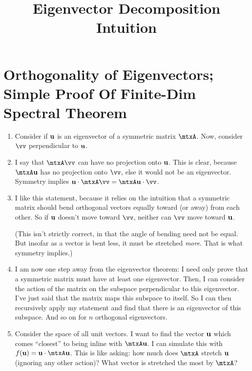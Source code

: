 \documentclass[11pt, oneside]{amsart}
\begin{document}
\title{Eigenvector Decomposition Intuition}
\maketitle


\section{Orthogonality of Eigenvectors; Simple Proof Of Finite-Dim Spectral Theorem}

\begin{enumerate}
  \item Consider if $\bm{\mathrm{u}}$ is an eigenvector of a symmetric matrix
  $\mtxA$. Now, consider $\vv$ perpendicular to $\bm{\mathrm{u}}$.

  \item I say that $\mtxA \vv$ can have no projection onto $\bm{\mathrm{u}}$. This
  is clear, because $\mtxA \vu$ has no projection onto $\vv$, else it
  would not be an eigenvector. Symmetry implies $\vu \cdot \mtxA\vv =
  \mtxA\vu \cdot \vv$.

  \item I like this statement, because it relies on the intuition that a
  symmetric matrix should bend orthogonal vectors equally toward (or
  away) from each other. So if $\bm{\mathrm{u}}$ doesn't move toward $\vv$, neither
  can $\vv$ move toward $\bm{\mathrm{u}}$.

  (This isn't strictly correct, in that the angle of bending need not be
  equal. But insofar as a vector is bent less, it must be stretched
  \emph{more}. That is what symmetry implies.)

  \item I am now one step away from the eigenvector theorem: I need only
  prove that a symmetric matrix must have at least one eigenvector.
  Then, I can consider the action of the matrix on the subspace
  perpendicular to this eigenvector. I've just said that the matrix maps
  this subspace to itself. So I can then recursively apply my statement
  and find that there is an eigenvector of this subspace. And so on for
  $n$ orthogonal eigenvectors.

  \item Consider the space of all unit vectors. I want to find the
  vector $\bm{\mathrm{u}}$ which comes ``closest'' to being inline with $\mtxA\vu$.
  I can simulate this with $\ff{\vu} = \vu \cdot \mtxA\vu$. This is like
  asking: how much does $\mtxA$ stretch $\bm{\mathrm{u}}$ (ignoring any other
  action)? What vector is stretched the most by $\mtxA$?


\end{enumerate}
\end{document}

